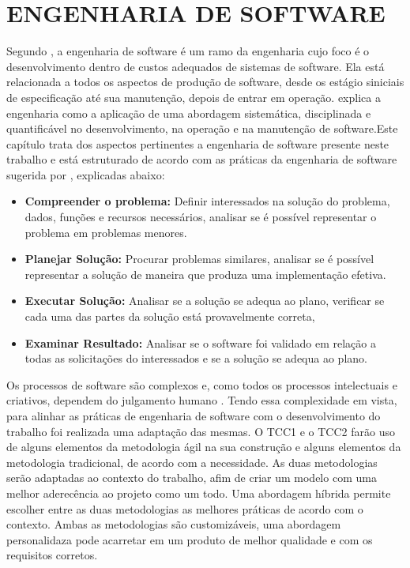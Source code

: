 
\chapter[Engenharia de software]{ENGENHARIA DE SOFTWARE}

Segundo \cite{sommerville2003engenharia} , a  engenharia de software é um ramo da engenharia cujo foco é o desenvolvimento dentro de custos adequados de sistemas de software. Ela está relacionada a todos os aspectos de produção de software, desde os estágio siniciais de especificação até sua manutenção, depois de entrar em operação. \cite{pressman2009engenharia} explica a engenharia como a aplicação de uma abordagem sistemática, disciplinada e quantificável no desenvolvimento, na operação e na manutenção de software.Este capítulo trata dos aspectos pertinentes a engenharia de software presente neste trabalho e está estruturado de acordo com as práticas da engenharia de software sugerida por \cite{pressman2009engenharia}, explicadas abaixo:

\begin{itemize}
\item  \textbf {Compreender o problema:} Definir interessados na solução do problema, dados, funções e recursos necessários, analisar se é possível representar o problema em problemas menores.
\item  \textbf {Planejar Solução:} Procurar problemas similares, analisar se é possível representar a solução de maneira que produza uma implementação efetiva. 
\item  \textbf {Executar Solução:} Analisar se a solução se adequa ao plano, verificar se cada uma das partes da solução está provavelmente correta, 
\item  \textbf {Examinar Resultado:} Analisar se o software foi validado em relação a todas as solicitações do interessados e se a solução se adequa ao plano.
\end{itemize}


 Os processos de software são complexos e, como todos os processos intelectuais e criativos, dependem do julgamento humano \cite{sommerville2003engenharia}. Tendo essa complexidade em vista, para alinhar as práticas de engenharia de software com o desenvolvimento do trabalho foi realizada uma adaptação das  mesmas. O TCC1 e o TCC2 farão uso de alguns elementos da metodologia ágil na sua construção e alguns elementos da metodologia tradicional, de acordo com a necessidade. As duas metodologias serão adaptadas ao contexto do trabalho, afim de criar um modelo com uma melhor aderecência ao projeto como um todo. Uma abordagem híbrida permite escolher entre as duas metodologias as melhores práticas de acordo com o contexto. Ambas as metodologias são customizáveis, uma abordagem personalidaza pode acarretar em um produto de melhor qualidade e com os requisitos corretos.


